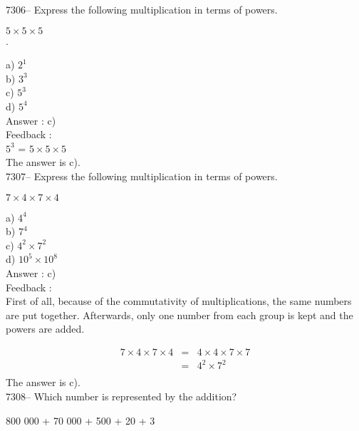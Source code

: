 \documentclass[letterpaper, 12pt]{article}
\begin{document}
7306-- Express the following multiplication in terms of powers.\\ 
\begin{center}
$5\times5\times5$\\.
\end{center}

a) $ 2^{1}$\\
b) $ 3^{3}$\\
c) $ 5^{3}$\\
d) $ 5^{4}$\\

Answer : c)\\

Feedback :\\
$ 5^{3}$ = $5\times5\times5$\\
The answer is c).\\




7307-- Express the following multiplication in terms of powers.\\ 
\begin{center}
$7\times4\times7\times4$\\
\end{center}

a) $ 4^{4}$\\
b) $ 7^{4}$\\
c) $ 4^{2}\times7^{2}$\\
d) $ 10^{5}\times10^{8}$\\

Answer : c)\\

Feedback :\\
First of all, because of the commutativity of multiplications, the same numbers are put together. 
Afterwards, only one number from each group is kept and the powers are added.

\begin{eqnarray*}
7\times4\times7\times4
&=&4\times4\times7\times7\\
&=&4^{2}\times7^{2}\\                                                                           \end{eqnarray*}
The answer is c).\\




7308-- Which number is represented by the addition?\\ 
\begin{center}
800 000 + 70 000 + 500 + 20 + 3\\
\end{center}
\end{document}
